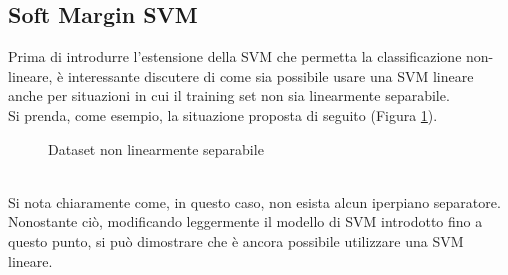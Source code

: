 \subsection{Soft Margin SVM}
Prima di introdurre l'estensione della SVM che permetta la classificazione non-lineare, è interessante discutere di come sia possibile usare una SVM lineare anche per situazioni in cui il training set non sia linearmente separabile.\\
Si prenda, come esempio, la situazione proposta di seguito (Figura \ref{fig:Dataset_nonseparabile}).
 \begin{figure}[!ht]
 \center
{}
    \caption{Dataset non linearmente separabile}
    \label{fig:Dataset_nonseparabile}
  \end{figure}
\\
Si nota chiaramente come, in questo caso, non esista alcun iperpiano separatore. 
Nonostante ciò, modificando leggermente il modello di SVM introdotto fino a questo punto, si può dimostrare che è ancora possibile utilizzare una SVM lineare.\\

